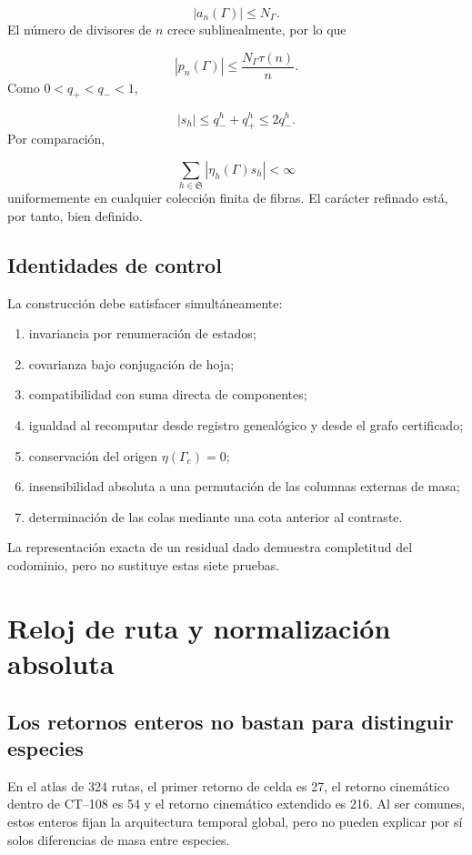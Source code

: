 \[
 |a_n(\Gamma)|\le N_\Gamma.
\]
El número de divisores de \(n\) crece sublinealmente, por lo que

\[
 |p_n(\Gamma)|
 \le\frac{N_\Gamma\tau(n)}n.
\]
Como \(0<q_+<q_-<1\),

\[
 |s_h|\le q_-^h+q_+^h\le2q_-^h.
\]
Por comparación,

\[
 \sum_{h\in\mathfrak S}|\eta_h(\Gamma)s_h|<\infty
\]
uniformemente en cualquier colección finita de fibras. El carácter refinado está, por tanto, bien definido.

\subsection{Identidades de control}
La construcción debe satisfacer simultáneamente:

\begin{enumerate}
\item invariancia por renumeración de estados;
\item covarianza bajo conjugación de hoja;
\item compatibilidad con suma directa de componentes;
\item igualdad al recomputar desde registro genealógico y desde el grafo certificado;
\item conservación del origen \(\eta(\Gamma_e)=0\);
\item insensibilidad absoluta a una permutación de las columnas externas de masa;
\item determinación de las colas mediante una cota anterior al contraste.
\end{enumerate}
La representación exacta de un residual dado demuestra completitud del codominio, pero no sustituye estas siete pruebas.

\section{Reloj de ruta y normalización absoluta}
\subsection{Los retornos enteros no bastan para distinguir especies}
En el atlas de 324 rutas, el primer retorno de celda es 27, el retorno cinemático dentro de CT--108 es 54 y el retorno cinemático extendido es 216. Al ser comunes, estos enteros fijan la arquitectura temporal global, pero no pueden explicar por sí solos diferencias de masa entre especies.


